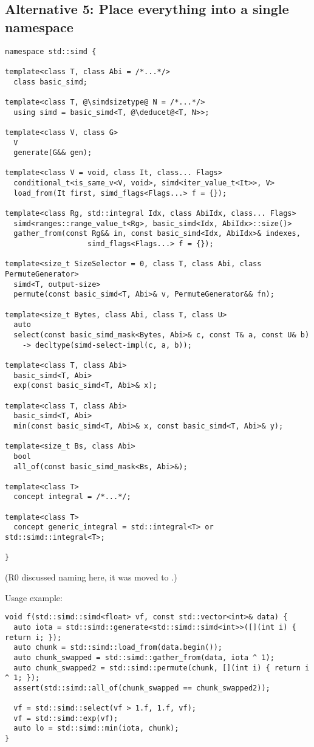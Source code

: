 \subsection{Alternative 5: Place everything into a single namespace}
\label{sec:singlenamespace}

\medskip\begin{lstlisting}[style=Vc]
namespace std::simd {

template<class T, class Abi = /*...*/>
  class basic_simd;

template<class T, @\simdsizetype@ N = /*...*/>
  using simd = basic_simd<T, @\deducet@<T, N>>;

template<class V, class G>
  V
  generate(G&& gen);

template<class V = void, class It, class... Flags>
  conditional_t<is_same_v<V, void>, simd<iter_value_t<It>>, V>
  load_from(It first, simd_flags<Flags...> f = {});

template<class Rg, std::integral Idx, class AbiIdx, class... Flags>
  simd<ranges::range_value_t<Rg>, basic_simd<Idx, AbiIdx>::size()>
  gather_from(const Rg&& in, const basic_simd<Idx, AbiIdx>& indexes,
                   simd_flags<Flags...> f = {});

template<size_t SizeSelector = 0, class T, class Abi, class PermuteGenerator>
  simd<T, output-size>
  permute(const basic_simd<T, Abi>& v, PermuteGenerator&& fn);

template<size_t Bytes, class Abi, class T, class U>
  auto
  select(const basic_simd_mask<Bytes, Abi>& c, const T& a, const U& b)
    -> decltype(simd-select-impl(c, a, b));

template<class T, class Abi>
  basic_simd<T, Abi>
  exp(const basic_simd<T, Abi>& x);

template<class T, class Abi>
  basic_simd<T, Abi>
  min(const basic_simd<T, Abi>& x, const basic_simd<T, Abi>& y);

template<size_t Bs, class Abi>
  bool
  all_of(const basic_simd_mask<Bs, Abi>&);

template<class T>
  concept integral = /*...*/;

template<class T>
  concept generic_integral = std::integral<T> or std::simd::integral<T>;

}
\end{lstlisting}

(R0 discussed naming here, it was moved to .)

Usage example:
\medskip\begin{lstlisting}[style=Vc]
void f(std::simd::simd<float> vf, const std::vector<int>& data) {
  auto iota = std::simd::generate<std::simd::simd<int>>([](int i) { return i; });
  auto chunk = std::simd::load_from(data.begin());
  auto chunk_swapped = std::simd::gather_from(data, iota ^ 1);
  auto chunk_swapped2 = std::simd::permute(chunk, [](int i) { return i ^ 1; });
  assert(std::simd::all_of(chunk_swapped == chunk_swapped2));

  vf = std::simd::select(vf > 1.f, 1.f, vf);
  vf = std::simd::exp(vf);
  auto lo = std::simd::min(iota, chunk);
}
\end{lstlisting}


